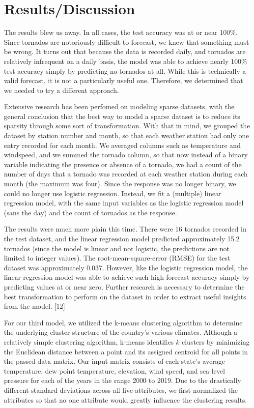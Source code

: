 \documentclass[conference]{IEEEtran}
\begin{document}
\section{Results/Discussion}

The results blew us away. In all cases, the test accuracy was at or near 100\%. Since tornados are notoriously difficult to forecast, we knew that something must be wrong. It turns out that because the data is recorded daily, and tornados are relatively infrequent on a daily basis, the model was able to achieve nearly 100\% test accuracy simply by predicting no tornados at all. While this is technically a valid forecast, it is not a particularly useful one. Therefore, we determined that we needed to try a different approach.

Extensive research has been perfomed on modeling sparse datasets, with the general conclusion that the best way to model a sparse dataset is to reduce its sparsity through some sort of transformation. With that in mind, we grouped the dataset by station number and month, so that each weather station had only one entry recorded for each month. We averaged columns such as temperature and windspeed, and we summed the tornado column, so that now instead of a binary variable indicating the presence or absence of a tornado, we had a count of the number of days that a tornado was recorded at each weather station during each month (the maximum was four). Since the response was no longer binary, we could no longer use logistic regression. Instead, we fit a (multiple) linear regression model, with the same input variables as the logistic regression model (sans the day) and the count of tornados as the response.

The results were much more plain this time. There were 16 tornados recorded in the test dataset, and the linear regression model predicted approximately 15.2 tornados (since the model is linear and not logistic, the predictions are not limited to integer values). The root-mean-square-error (RMSE) for the test dataset was approximately 0.037. However, like the logistic regression model, the linear regression model was able to achieve such high forecast accuracy simply by predicting values at or near zero. Further research is necessary to determine the best transformation to perform on the dataset in order to extract useful insights from the model. [12]

For our third model, we utilized the k-means clustering algorithm to determine the underlying cluster structure of the country's various climates. Although a relatively simple clustering algorithm, k-means identifies $k$ clusters by minimizing the Euclidean distance between a point and its assigned centroid for all points in the passed data matrix. Our input matrix consists of each state's average temperature, dew point temperature, elevation, wind speed, and sea level pressure for each of the years in the range 2000 to 2019. Due to the drastically different standard deviations across all five attributes, we first normalized the attributes so that no one attribute would greatly influence the clustering results.
\end{document}

